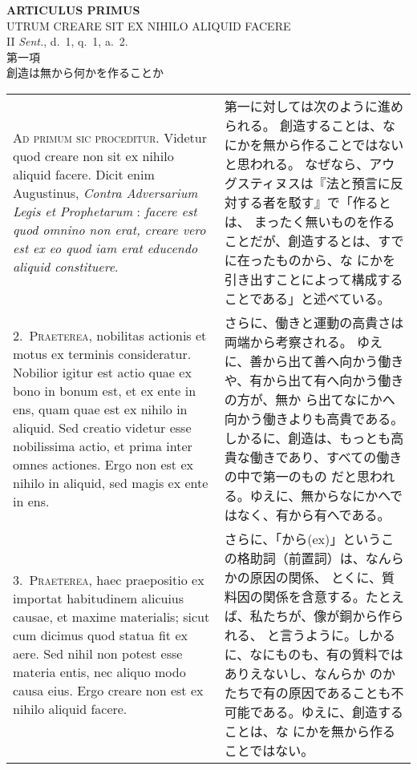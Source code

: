 \documentclass[10pt]{jsarticle} %
\begin{document}
\newpage
{}
\begin{center}
{\Large {\bf ARTICULUS PRIMUS}}\\
 {\large UTRUM CREARE SIT EX NIHILO ALIQUID FACERE}\\
 {\footnotesize II {\itshape Sent.}, d.~1, q.~1, a.~2.}\\
 {\Large 第一項\\創造は無から何かを作ることか}
\end{center}

\begin{longtable}{p{21em}p{21em}}
{\huge A}{\scshape d primum sic proceditur}. Videtur quod creare non sit ex nihilo aliquid
 facere. Dicit enim Augustinus, {\it Contra Adversarium Legis et
 Prophetarum} : {\it facere est quod omnino non erat, creare vero est ex
 eo quod iam erat educendo aliquid constituere}.

&

第一に対しては次のように進められる。
創造することは、なにかを無から作ることではないと思われる。
なぜなら、アウグスティヌスは『法と預言に反対する者を駁す』で「作るとは、
 まったく無いものを作ることだが、創造するとは、すでに在ったものから、な
 にかを引き出すことによって構成することである」と述べている。

\\

2.~{\scshape Praeterea}, nobilitas actionis et motus ex
 terminis consideratur. Nobilior igitur est actio quae ex bono in bonum
 est, et ex ente in ens, quam quae est ex nihilo in aliquid. Sed creatio
 videtur esse nobilissima actio, et prima inter omnes actiones. Ergo non
 est ex nihilo in aliquid, sed magis ex ente in ens.
&

さらに、働きと運動の高貴さは両端から考察される。
ゆえに、善から出て善へ向かう働きや、有から出て有へ向かう働きの方が、無か
 ら出てなにかへ向かう働きよりも高貴である。
しかるに、創造は、もっとも高貴な働きであり、すべての働きの中で第一のもの
 だと思われる。ゆえに、無からなにかへではなく、有から有へである。

\\

3.~{\scshape Praeterea}, haec praepositio ex importat habitudinem alicuius causae, et
 maxime materialis; sicut cum dicimus quod statua fit ex aere.
Sed nihil
 non potest esse materia entis, nec aliquo modo causa eius. Ergo creare
 non est ex nihilo aliquid facere.

&

さらに、「から(ex)」というこの格助詞（前置詞）は、なんらかの原因の関係、
 とくに、質料因の関係を含意する。たとえば、私たちが、像が銅から作られる、
 と言うように。しかるに、なにものも、有の質料ではありえないし、なんらか
 のかたちで有の原因であることも不可能である。ゆえに、創造することは、な
 にかを無から作ることではない。


\end{longtable}
\end{document}
